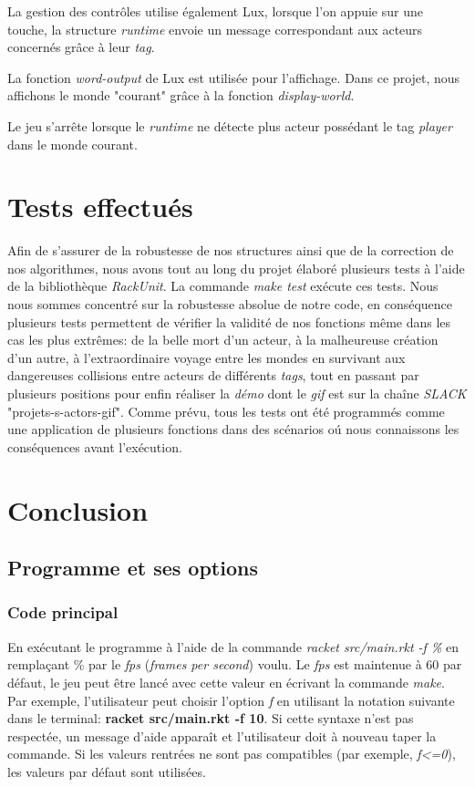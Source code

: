 \documentclass{article}
\begin{document}
La gestion des contrôles utilise également Lux, lorsque l'on appuie sur une touche, la structure \textit{runtime} envoie un message correspondant aux acteurs concernés grâce à leur \textit{tag}.

La fonction \textit{word-output} de Lux est utilisée pour l'affichage. Dans ce projet, nous affichons le monde "courant" grâce à la fonction \textit{display-world}.

Le jeu s'arrête lorsque le \textit{runtime} ne détecte plus acteur possédant le tag \textit{player} dans le monde courant.

\section {Tests effectués}
Afin de s'assurer de la robustesse de nos structures ainsi que de la correction de nos algorithmes, nous avons tout au long du projet élaboré plusieurs tests à l'aide de la bibliothèque \textit{RackUnit}. La commande \textit{make test} exécute ces tests. Nous nous sommes concentré sur la robustesse absolue de notre code, en conséquence plusieurs tests permettent de vérifier la validité de nos fonctions même dans les cas les plus extrêmes: de la belle mort d'un acteur, à la malheureuse création d'un autre, à l'extraordinaire voyage entre les mondes en survivant aux dangereuses collisions entre acteurs de différents \textit{tags}, tout en passant par plusieurs positions pour enfin réaliser la \textit{démo} dont le \textit{gif} est sur la chaîne \textit{SLACK} "projets-s-actors-gif".
Comme prévu, tous les tests ont été programmés comme une application de plusieurs fonctions dans des scénarios o\'u nous connaissons les conséquences avant l'exécution.

\section{Conclusion}

\subsection{Programme et ses options}

\subsubsection{Code principal}
En exécutant le programme à l'aide de la commande \textit{racket src/main.rkt -f \%} en remplaçant \% par le \textit{fps} (\textit{frames per second}) voulu. Le \textit{fps}
est maintenue à 60 par défaut, le jeu peut être lancé avec cette valeur en écrivant la commande \textit{make}. 
Par exemple, l'utilisateur peut choisir l'option \textit{f} en utilisant la notation suivante dans le terminal: \textbf{racket src/main.rkt -f 10}. Si cette syntaxe n'est pas respectée, un message d'aide apparaît et l'utilisateur doit à nouveau taper la commande. Si les valeurs rentrées ne sont pas compatibles (par exemple, \textit{f<=0}), les valeurs par défaut sont utilisées. 
\end{document}
